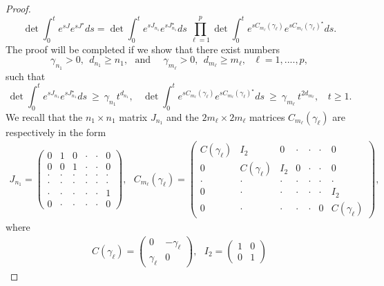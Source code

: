 \documentclass[11pt,letter]{amsart}
\numberwithin{equation}{section}
\numberwithin{equation}{section}
\begin{document}
\begin{proof}
\[
\det \int_{0}^{t}e^{sJ}e^{sJ^{\star}}ds = \det \int_0^t e^{s J_{n_1}}e^{s J_{n_1}^\star} ds\  \prod_{\ell=1}^p \det \int_0^t e^{s C_{m_{\ell}}(\gamma_{\ell})}e^{s C_{m_{\ell}}(\gamma_{\ell})^\star} ds.
\]
The proof will be completed if we show that there exist numbers 
\[
\gamma_{n_1}>0,\ \  d_{n_1}\ge n_1,\ \ \ \text{and}\ \ \ \ \ \ \gamma_{m_\ell}>0,\ \ d_{m_\ell}\ge m_\ell,\ \ \ \ell = 1,....,p,
\]
such that 
\begin{equation}\label{hwg}
\det \int_0^t e^{s J_{n_1}}e^{s J_{n_1}^\star} ds \ \ge\ \gamma_{n_1} t^{d_{n_1}},\ \ \ \ \det \int_0^t e^{s C_{m_{\ell}}(\gamma_{\ell})}e^{s C_{m_{\ell}}(\gamma_{\ell})^\star} ds\ \ge\ \gamma_{m_\ell}\ t^{2 d_{m_\ell}},\ \ \ \ t\ge 1.
\end{equation}
We recall that the $n_{1}\times n_{1}$ matrix $J_{n_{1}}$ and the $2m_{\ell}\times 2m_{\ell}$ matrices $C_{m_{\ell}}(\gamma_{\ell})$ are respectively in the form
\begin{align*}
J_{n_{1}}=\begin{pmatrix}
0 & 1 & 0 & \cdot & \cdot  & 0 \\
0 & 0 & 1 & \cdot  & \cdot &  0 \\
\cdot  & \cdot  & \cdot  & \cdot &  \cdot  & \cdot\\
\cdot & \cdot & \cdot & \cdot & \cdot   & \cdot\\
\cdot & \cdot & \cdot &\cdot & \cdot & 1 \\
0 & \cdot & \cdot & \cdot & \cdot &  0
\end{pmatrix}, \ \ \ C_{m_{\ell}}(\gamma_{\ell})=\begin{pmatrix}
C(\gamma_{\ell}) & I_{2} & 0 & \cdot & \cdot & \cdot & 0 \\
0 & C(\gamma_{\ell}) & I_{2} & 0 & \cdot & \cdot & 0 \\
\cdot & \cdot & \cdot & \cdot& \cdot & \cdot & \cdot \\
0 & \cdot & \cdot & \cdot & \cdot & \cdot &  I_{2} \\
0 & \cdot & \cdot & \cdot & \cdot & 0 & C(\gamma_{\ell})
\end{pmatrix},
\end{align*}
where 
\begin{align*}
C(\gamma_{\ell})=\begin{pmatrix}
0 & -\gamma_{\ell}\\
\gamma_{\ell} & 0
\end{pmatrix}, \ \ \ I_{2}=\begin{pmatrix}
1 & 0 \\
0 & 1

\end{pmatrix}
\end{align*}
\end{proof}
\end{document}
